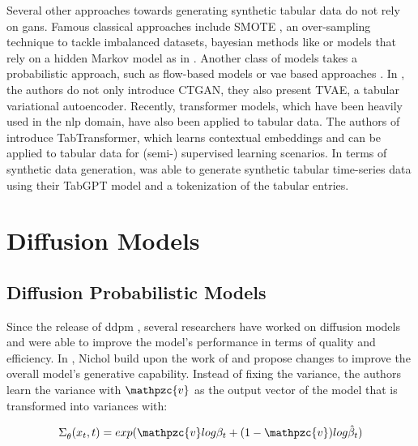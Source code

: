 Several other approaches towards generating synthetic tabular data do not rely on \glspl{gan}.
Famous classical approaches include SMOTE \cite{chawla2002SMOTESyntheticMinority}, an over-sampling technique to tackle imbalanced datasets, bayesian methods like \cite{zhang2017PrivBayesPrivateData} or models that rely on a hidden Markov model as in \cite{dahmen2019SynSysSyntheticData}.
Another class of models takes a probabilistic approach, such as flow-based models \cite{kamthe2021CopulaFlowsSynthetic} or \gls{vae} based approaches \cite{kingma2013AutoEncodingVariationalBayes}.
In \cite{xu2019ModelingTabularData}, the authors do not only introduce CTGAN, they also present TVAE, a tabular variational autoencoder.
Recently, transformer models, which have been heavily used in the \gls{nlp} domain, have also been applied to tabular data.
The authors of \cite{huang2020TabTransformerTabularData} introduce TabTransformer, which learns contextual embeddings and can be applied to tabular data for (semi-) supervised learning scenarios.
In terms of synthetic data generation, \cite{padhi2021TabularTransformersModeling} was able to generate synthetic tabular time-series data using their TabGPT model and a tokenization of the tabular entries.



\section{Diffusion Models}
\label{ch:relatedWork-diffusionModels}

\subsection{Diffusion Probabilistic Models}
\label{ch:preliminaries-diffusionProbabilisticModelsTabularData}

Since the release of \gls{ddpm} \cite{ho2020DenoisingDiffusionProbabilistic}, several researchers have worked on diffusion models and were able to improve the model's performance in terms of quality and efficiency.
In \cite{nichol2021ImprovedDenoisingDiffusion}, Nichol \etal build upon the work of \cite{ho2020DenoisingDiffusionProbabilistic} and propose changes to improve the overall model's generative capability.
Instead of fixing the variance, the authors learn the variance with $\mathpzc{v}$ as the output vector of the model that is transformed into variances with:

\begin{equation}
    \label{eqn:impr_diff}
    \begin{align*}
        \Sigma_{\theta}^{}(x_t,t)=exp(\mathpzc{v}log\beta_t+(1-\mathpzc{v})log\hat{\beta}_t)
    \end{align*}
\end{equation}

